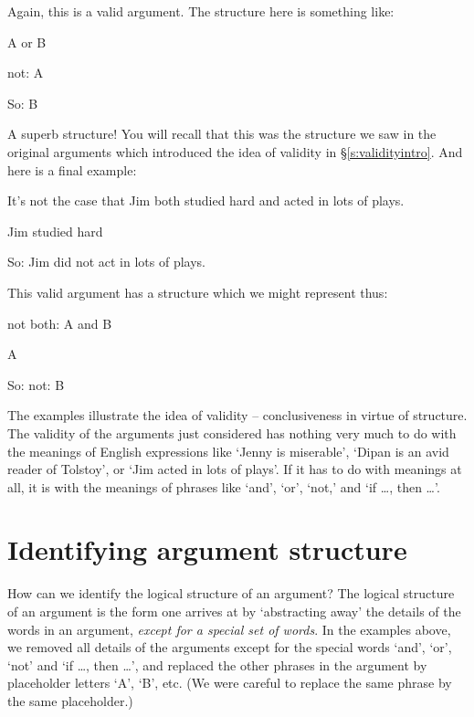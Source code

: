 Again, this is a valid argument. The structure here is something like:
	\begin{earg}
		\item[] A \textsf{or} B
		\item[] \textsf{not}: A
		\item[So:] B
	\end{earg}
A superb structure! You will recall that this was the structure we saw in the original arguments which introduced the idea of validity in §\ref{s:validityintro}. And here is a final example:
	\begin{earg}
		\item[] \textsf{It's not the case that} Jim \textsf{both} studied hard \textsf{and} acted in lots of plays.
		\item[] Jim studied hard
		\item[So:] Jim did \textsf{not} act in lots of plays.
	\end{earg}
This valid argument has a structure which we might represent thus:
	\begin{earg}
		\item[] \textsf{not both}: A \textsf{and} B
		\item[] A
		\item[So:] \textsf{not}: B
	\end{earg}
The examples illustrate the idea of validity – conclusiveness in virtue of structure. The validity of the arguments just considered has nothing very much to do with the meanings of English expressions like `Jenny is miserable', `Dipan is an avid reader of Tolstoy', or `Jim acted in lots of plays'. If it has to do with meanings at all, it is with the meanings of phrases like `and', `or', `not,' and `if …, then …'. 




\section{Identifying argument structure}\label{ss.idargstr}

How can we identify the logical structure of an argument? The logical structure of an argument is the form one arrives at by `abstracting away' the details of the words in an argument, \emph{except for a special set of words}. In the examples above, we removed all details of the arguments except for the special words `and', `or', `not' and `if …, then …', and replaced the other phrases in the argument by placeholder letters `A', `B', etc. (We were careful to replace the same phrase by the same placeholder.)

